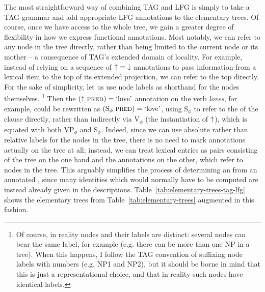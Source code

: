 \documentclass[output=paper,hidelinks]{langscibook}
\begin{document}
The most straightforward way of combining TAG and LFG is simply to take a TAG
grammar and add appropriate LFG annotations to the elementary trees. Of course,
once we have access to the whole tree, we gain a greater degree of flexibility
in how we express functional annotations. Most notably, we can refer to any node
in the tree directly, rather than being limited to the current node or its
mother -- a consequence of TAG's extended domain of locality. For example,
instead of relying on a sequence of $\mbox{$\uparrow$}{}=\mbox{$\downarrow$}{}$ annotations to pass information
from a lexical item to the top of its extended projection, we can refer to the
top directly. For the sake of simplicity, let us use node labels as shorthand
for the nodes themselves.%
%
\footnote{Of course, in reality nodes and their labels are distinct: several
  nodes can bear the same label, for example (e.g. there can be more than one NP
  in a tree). When this happens, I follow the TAG convention of suffixing node
  labels with numbers (e.g. NP1 and NP2), but it should be borne in mind that
  this is just a representational choice, and that in reality such nodes have
  identical labels.}
%
Then the $(\mbox{$\uparrow$}{}\ \textsc{pred}{}) = \textrm{`love'}$ annotation on the verb \textit{loves},
for example, could be rewritten as
$(\textrm{S}_{\phi}\ \textsc{pred}{}) = \textrm{`love'}$, using S$_{\phi}$ to refer to the
\fstruc{} of the clause directly, rather than indirectly via V$_{\phi}$ (the
instantiation of $\mbox{$\uparrow$}{}$), which is equated with both VP$_{\phi}$ and S$_{\phi}$.
Indeed, since we can use absolute rather than relative labels for the nodes in
the tree, there is no need to mark annotations actually on the tree at all;
instead, we can treat lexical entries as pairs consisting of the tree on the one
hand and the annotations on the other, which refer to nodes in the tree. This
arguably simplifies the process of determining an \fstruc{} from an annotated
\cstruc{}, since many identities which would normally have to be computed are
instead already given in the descriptions.
Table~\ref{tab:elementary-trees-tag-lfg} shows the elementary trees from
Table~\ref{tab:elementary-trees} augmented in this fashion.%
\end{document}
